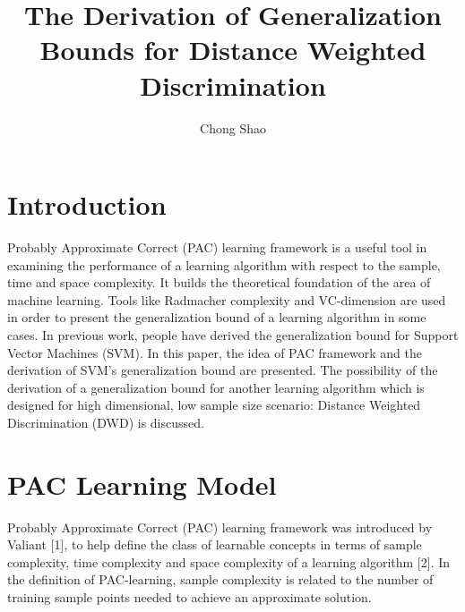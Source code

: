 \documentclass[12pt]{article}
\theoremstyle{definition}
\theoremstyle{remark}
\numberwithin{equation}{section}
\begin{document}
\title{The Derivation of Generalization Bounds for Distance Weighted Discrimination}%
\author{Chong Shao}%

\maketitle
\section{Introduction}
Probably Approximate Correct (PAC) learning framework is a useful tool in examining the performance of a learning algorithm with respect to the sample, time and space complexity. It builds the theoretical foundation of the area of machine learning. Tools like Radmacher complexity and VC-dimension are used in order to present the generalization bound of a learning algorithm in some cases. In previous work, people have derived the generalization bound for Support Vector Machines (SVM). In this paper, the idea of PAC framework and the derivation of SVM's generalization bound are presented. The possibility of the derivation of a generalization bound for another learning algorithm which is designed for high dimensional, low sample size scenario: Distance Weighted Discrimination (DWD) is discussed.
\section{PAC Learning Model}
Probably Approximate Correct (PAC) learning framework was introduced by Valiant [1], to help define the class of learnable concepts in terms of sample complexity, time complexity and space complexity of a learning algorithm [2]. In the definition of PAC-learning, sample complexity is related to the number of training sample points needed to achieve an approximate solution.
\end{document}
